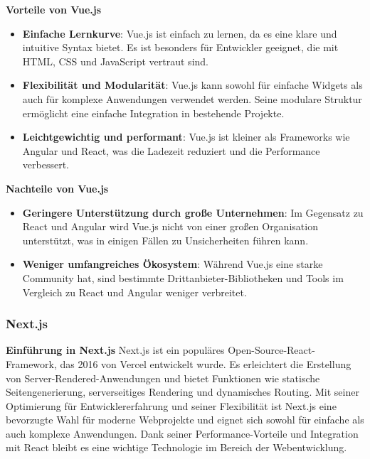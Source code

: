 \textbf{Vorteile von Vue.js}
\begin{itemize}
	\item \textbf{Einfache Lernkurve}: Vue.js ist einfach zu lernen, da es eine klare und intuitive Syntax bietet. Es ist besonders für Entwickler geeignet, die mit HTML, CSS und JavaScript vertraut sind.\textit{\cite{madurapperuma2022state, vuejs}}
	
	\item \textbf{Flexibilität und Modularität}: Vue.js kann sowohl für einfache Widgets als auch für komplexe Anwendungen verwendet werden. Seine modulare Struktur ermöglicht eine einfache Integration in bestehende Projekte.\textit{\cite{rathinam2022analysis, vuejs}}
	
	\item \textbf{Leichtgewichtig und performant}: Vue.js ist kleiner als Frameworks wie Angular und React, was die Ladezeit reduziert und die Performance verbessert.\textit{\cite{shetty2020review, vuejs}}
\end{itemize}

\textbf{Nachteile von Vue.js}
\begin{itemize}
	\item \textbf{Geringere Unterstützung durch große Unternehmen}: Im Gegensatz zu React und Angular wird Vue.js nicht von einer großen Organisation unterstützt, was in einigen Fällen zu Unsicherheiten führen kann.\textit{\cite{rathinam2022analysis, vue_blog}}
	
	\item \textbf{Weniger umfangreiches Ökosystem}: Während Vue.js eine starke Community hat, sind bestimmte Drittanbieter-Bibliotheken und Tools im Vergleich zu React und Angular weniger verbreitet.\textit{\cite{hutagikar2020analysis, vue_blog}}
\end{itemize}


\subsubsection{Next.js}

\textbf{Einführung in Next.js}
\newline Next.js ist ein populäres Open-Source-React-Framework, das 2016 von Vercel entwickelt wurde. Es erleichtert die Erstellung von Server-Rendered-Anwendungen und bietet Funktionen wie statische Seitengenerierung, serverseitiges Rendering und dynamisches Routing. Mit seiner Optimierung für Entwicklererfahrung und seiner Flexibilität ist Next.js eine bevorzugte Wahl für moderne Webprojekte und eignet sich sowohl für einfache als auch komplexe Anwendungen. Dank seiner Performance-Vorteile und Integration mit React bleibt es eine wichtige Technologie im Bereich der Webentwicklung.\textit{\cite{nextjs, rathinam2022analysis, shetty2020review}}

